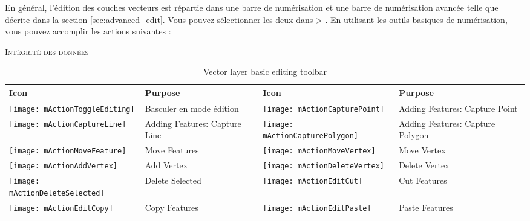 \begin{itemize}

En général, l'édition des couches vecteurs est répartie dans une barre de numérisation et une barre de numérisation avancée telle que décrite dans la section \ref{sec:advanced_edit}. Vous pouvez sélectionner les deux dans  > . En utilisant les outils basiques de numérisation, vous pouvez accomplir les actions suivantes :

\begin{Astuce}[ht]\caption{\textsc{Intégrité des données}}
\end{Astuce}
\begin{table}[h]
\centering
\caption{Vector layer basic editing toolbar}\label{tab:vector_editing}\medskip
\small
\begin{tabular}{|l|p{6.9cm}|l|p{6.9cm}|}
\hline \textbf{Icon} & \textbf{Purpose} & \textbf{Icon} & \textbf{Purpose} \\
\hline \texttt{[image: mActionToggleEditing]}
   & Basculer en mode édition
   & \texttt{[image: mActionCapturePoint]}
   & Adding Features: Capture Point \\
\hline \texttt{[image: mActionCaptureLine]}
   & Adding Features: Capture Line
   & \texttt{[image: mActionCapturePolygon]}
   & Adding Features: Capture Polygon \\
\hline \texttt{[image: mActionMoveFeature]}
   & Move Features
   & \texttt{[image: mActionMoveVertex]}
   & Move Vertex \\
\hline \texttt{[image: mActionAddVertex]}
   & Add Vertex
   & \texttt{[image: mActionDeleteVertex]}
   & Delete Vertex \\
\hline \texttt{[image: mActionDeleteSelected]}
   & Delete Selected
   & \texttt{[image: mActionEditCut]}
   & Cut Features \\
\hline \texttt{[image: mActionEditCopy]}
   & Copy Features
   & \texttt{[image: mActionEditPaste]} 
   & Paste Features \\
\hline
\end{tabular}
\end{table}


\end{itemize}
